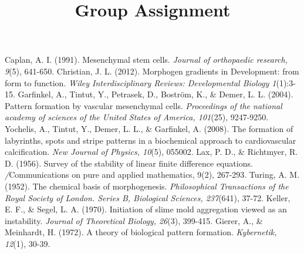 \documentclass[12pt]{article}
\title{Group Assignment}
\begin{document}
\maketitle











\begin{thebibliography}{}
	Caplan, A. I. (1991). Mesenchymal stem cells. \textit{Journal of orthopaedic research, 9}(5), 641-650.
	Christian, J. L. (2012). Morphogen gradients in Development: from form to function. \textit{Wiley Interdisciplinary Reviews: Developmental Biology 1}(1):3-15.
	Garfinkel, A., Tintut, Y., Petrasek, D., Boström, K., \& Demer, L. L. (2004). Pattern formation by vascular mesenchymal cells. \textit{Proceedings of the national academy of sciences of the United States of America, 101}(25), 9247-9250.
	Yochelis, A., Tintut, Y., Demer, L. L., \& Garfinkel, A. (2008). The formation of labyrinths, spots and stripe patterns in a biochemical approach to cardiovascular calcification. \textit{New Journal of Physics, 10}(5), 055002.
	Lax, P. D., \& Richtmyer, R. D. (1956). Survey of the stability of linear finite difference equations. \textit/{Communications on pure and applied mathematics, 9}(2), 267-293.
	Turing, A. M. (1952). The chemical basis of morphogenesis. \textit{Philosophical Transactions of the Royal Society of London. Series B, Biological Sciences, 237}(641), 37-72.
	Keller, E. F., \& Segel, L. A. (1970). Initiation of slime mold aggregation viewed as an instability. \textit{Journal of Theoretical Biology, 26}(3), 399-415.
	Gierer, A., \& Meinhardt, H. (1972). A theory of biological pattern formation. \textit{Kybernetik, 12}(1), 30-39.
	

\end{thebibliography}
\end{document}
